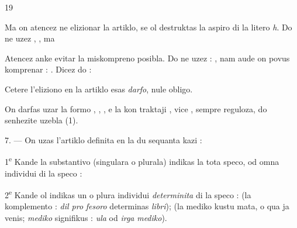 \begin{VUpage}[23]{19}

Ma on atencez ne elizionar la artiklo, se ol destruktas la\nl
aspiro di la litero \textit{h}. Do ne uzez , , ma \nl
{}

Atencez anke evitar la miskompreno posibla. Do ne uzez :\nl
{}, nam aude on povus komprenar : \nl
{}. Dicez do : 

Cetere l'eliziono en la artiklo esas \textit{darfo}, nule obligo.

On darfas uzar la formo , , ,  e la kon\cc
traktaji , vice , sempre\nl
reguloza, do senhezite uzebla (1).

\VUblanc{5.00pt}%
7. --- On uzas l'artiklo definita en la du sequanta\nl
kazi :

1\textsuperscript{e} Kande la substantivo (singulara o plurala) indikas la\nl
tota speco, od omna individui di la speco : \nl
{}\nl
{}

2\textsuperscript{e} Kande ol indikas un o plura individui \textit{determinita} di\nl
la speco :  (la komplemento : \textit{dil pro}\cc
\textit{fesoro} determinas \textit{libri});  (la mediko kustu\cc
mata, o qua ja venis; \textit{mediko} signifikus : \textit{ula} od \textit{irga}\nl
\textit{mediko}).


\end{VUpage}
